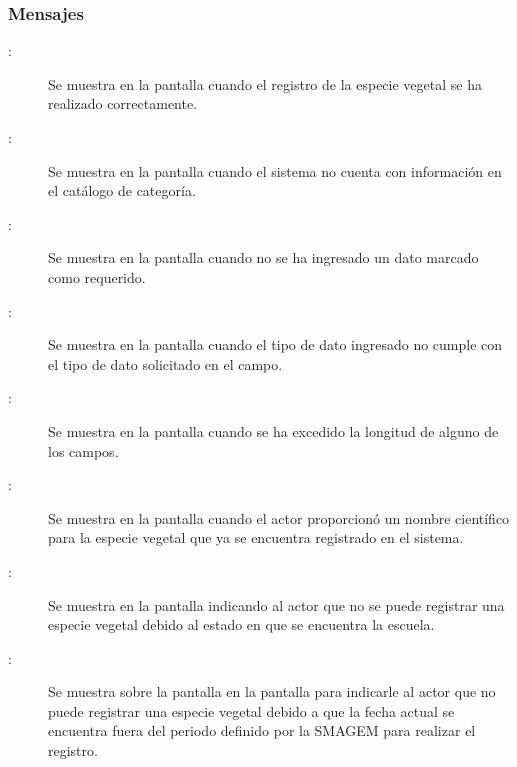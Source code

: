 \subsubsection{Mensajes}

    \begin{description}
      
        \item [:] Se muestra en la pantalla  cuando el registro de la especie vegetal se ha realizado correctamente.        
        
        \item [:] Se muestra en la pantalla  cuando el sistema no cuenta con información en el catálogo de categoría.
        
        \item [:] Se muestra en la pantalla  cuando no se ha ingresado un dato marcado como requerido.
        
         \item [:] Se muestra en la pantalla  cuando el tipo de dato ingresado no cumple con el tipo de dato solicitado en el campo.
        
        \item [:] Se muestra en la pantalla  cuando se ha excedido la longitud de alguno de los campos.
        
        \item [:] Se muestra en la pantalla  cuando el actor proporcionó un nombre científico  para la especie vegetal que ya se encuentra registrado en el sistema.
         
        \item[:] Se muestra en la pantalla  indicando al actor que no se puede registrar una especie vegetal debido al estado en que se encuentra la escuela.
       
       \item [:] Se muestra sobre la pantalla en la pantalla  para indicarle al actor que no puede registrar una especie vegetal debido a que la fecha actual se encuentra fuera del periodo definido por la SMAGEM para realizar el registro.
        
    \end{description}
